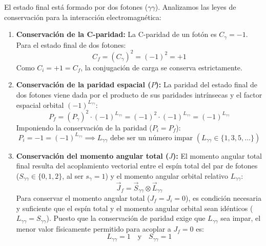 \begin{problema}
El estado final está formado por dos fotones ($\gamma\gamma$). Analizamos las leyes de conservación para la interacción electromagnética:

\begin{enumerate}[label=\arabic*.]
    \item \textbf{Conservación de la C-paridad:} La C-paridad de un fotón es $C_\gamma = -1$. Para el estado final de dos fotones:
    \begin{equation*}
        C_f = (C_\gamma)^2 = (-1)^2 = +1
    \end{equation*}
    Como $C_i = +1 = C_f$, la conjugación de carga se conserva estrictamente.

    \item \textbf{Conservación de la paridad espacial ($P$):} La paridad del estado final de dos fotones viene dada por el producto de sus paridades intrínsecas y el factor espacial orbital $(-1)^{L_{\gamma\gamma}}$:
    \begin{equation*}
        P_f = (P_\gamma)^2 \cdot (-1)^{L_{\gamma\gamma}} = (-1)^2 \cdot (-1)^{L_{\gamma\gamma}} = (-1)^{L_{\gamma\gamma}}
    \end{equation*}
    Imponiendo la conservación de la paridad ($P_i = P_f$):
    \begin{equation*}
        P_i = -1 = (-1)^{L_{\gamma\gamma}} \implies L_{\gamma\gamma} \text{ debe ser un número impar } (L_{\gamma\gamma} \in \{1, 3, 5, \dots\})
    \end{equation*}

    \item \textbf{Conservación del momento angular total ($J$):} El momento angular total final resulta del acoplamiento vectorial entre el espín total del par de fotones ($S_{\gamma\gamma} \in \{0, 1, 2\}$, al ser $s_\gamma = 1$) y el momento angular orbital relativo $L_{\gamma\gamma}$:
    \begin{equation*}
        \vec{J}_f = \vec{S}_{\gamma\gamma} \otimes \vec{L}_{\gamma\gamma}
    \end{equation*}
    Para conservar el momento angular total ($J_f = J_i = 0$), es condición necesaria y suficiente que el espín total y el momento angular orbital sean idénticos ($L_{\gamma\gamma} = S_{\gamma\gamma}$). Puesto que la conservación de paridad exige que $L_{\gamma\gamma}$ sea impar, el menor valor físicamente permitido para acoplar a $J_f = 0$ es:
    \begin{equation*}
        L_{\gamma\gamma} = 1 \quad \text{y} \quad S_{\gamma\gamma} = 1
    \end{equation*}
\end{enumerate}


\end{problema}
